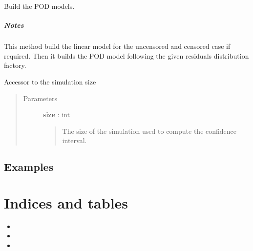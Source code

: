 \documentclass[letterpaper,10pt,english]{sphinxmanual}
\begin{document}
\begin{fulllineitems}

\begin{fulllineitems}
\label{_generated/otpod.UnivariateLinearModelPOD:otpod.UnivariateLinearModelPOD.run}
Build the POD models.
\paragraph{Notes}

This method build the linear model for the uncensored and censored case
if required. Then it builds the POD model following the given residuals
distribution factory.

\end{fulllineitems}


\begin{fulllineitems}
\label{_generated/otpod.UnivariateLinearModelPOD:otpod.UnivariateLinearModelPOD.setSimulationSize}
Accessor to the simulation size
\begin{quote}\begin{description}
\item[{Parameters}] \leavevmode
\textbf{size} : int
\begin{quote}

The size of the simulation used to compute the confidence interval.
\end{quote}

\end{description}\end{quote}

\end{fulllineitems}


\end{fulllineitems}



\section{Examples}
\label{examples::doc}\label{examples:examples}

\chapter{Indices and tables}
\label{index:indices-and-tables}\begin{itemize}
\item {} 

\item {} 

\item {} 

\end{itemize}



\renewcommand{\indexname}{Index}
\printindex
\end{document}
